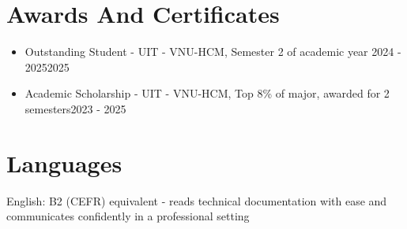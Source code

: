 \documentclass[10pt, a4paper]{article}
\newcommand{\award}[3]{\item #1 {\color{MutedText}- #2}\hfill{\color{MutedText}#3}}
\begin{document}
\section{Awards And Certificates}
\begin{itemize}
  \award{Outstanding Student}{UIT - VNU-HCM, Semester 2 of academic year 2024 - 2025}{2025}
  \award{Academic Scholarship}{UIT - VNU-HCM, Top 8\% of major, awarded for 2 semesters}{2023 - 2025}
\end{itemize}

\section{Languages}
English: B2 (CEFR) equivalent - reads technical documentation with ease and communicates confidently in a professional setting\par
\end{document}
